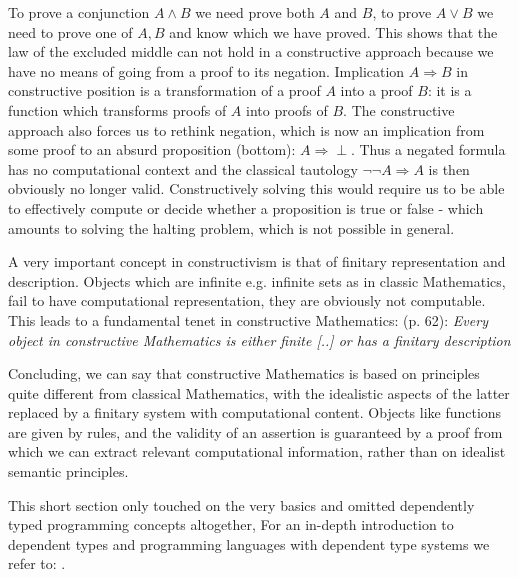 To prove a conjunction $A \land B$ we need prove both $A$ and $B$, to prove $A \lor B$ we need to prove one of $A, B$ and know which we have proved. This shows that the law of the excluded middle can not hold in a constructive approach because we have no means of going from a proof to its negation. Implication $A \Rightarrow B$ in constructive position is a transformation of a proof $A$ into a proof $B$: it is a function which transforms proofs of $A$ into proofs of $B$. The constructive approach also forces us to rethink negation, which is now an implication from some proof to an absurd proposition (bottom): $A \Rightarrow \perp$. Thus a negated formula has no computational context and the classical tautology $\neg \neg A \Rightarrow A$ is then obviously no longer valid.  Constructively solving this would require us to be able to effectively compute or decide whether a proposition is true or false - which amounts to solving the halting problem, which is not possible in general.

A very important concept in constructivism is that of finitary representation and description. Objects which are infinite e.g. infinite sets as in classic Mathematics, fail to have computational representation, they are obviously not computable. This leads to a fundamental tenet in constructive Mathematics: \cite{thompson_type_1991} (p. 62): \textit{Every object in constructive Mathematics is either finite [..] or has a finitary description}

Concluding, we can say that constructive Mathematics is based on principles quite different from classical Mathematics, with the idealistic aspects of the latter replaced by a finitary system with computational content. Objects like functions are given by rules, and the validity of an assertion is guaranteed by a proof from which we can extract relevant computational information, rather than on idealist semantic principles. 

This short section only touched on the very basics and omitted dependently typed programming concepts altogether, For an in-depth introduction to dependent types and programming languages with dependent type systems we refer to: \cite{brady_type-driven_2017, pierce_programming_2018, program_homotopy_2013, stump_verified_2016, thompson_type_1991}.


